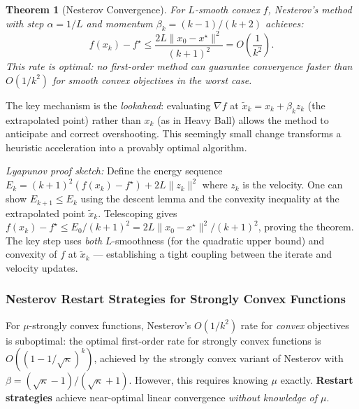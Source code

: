 \documentclass[11pt,a4paper]{article}
\newtheorem{theorem}{Theorem}[section]
\theoremstyle{definition}
\begin{document}
\begin{theorem}[Nesterov Convergence]
For $L$-smooth convex $f$, Nesterov's method with step $\alpha = 1/L$ and momentum $\beta_k = (k-1)/(k+2)$ achieves:
\begin{equation}
f(x_k) - f^{\star} \leq \frac{2L\|x_0 - x^{\star}\|^2}{(k+1)^2} = O\!\left(\frac{1}{k^2}\right).
\end{equation}
This rate is optimal: no first-order method can guarantee convergence faster than $O(1/k^2)$ for smooth convex objectives in the worst case.
\end{theorem}

The key mechanism is the \emph{lookahead}: evaluating $\nabla f$ at $\tilde{x}_k = x_k + \beta_k z_k$ (the extrapolated point) rather than $x_k$ (as in Heavy Ball) allows the method to anticipate and correct overshooting. This seemingly small change transforms a heuristic acceleration into a provably optimal algorithm.

\noindent\textit{Lyapunov proof sketch:} Define the energy sequence $E_k = (k+1)^2(f(x_k) - f^{\star}) + 2L\|z_k\|^2$ where $z_k$ is the velocity. One can show $E_{k+1} \leq E_k$ using the descent lemma and the convexity inequality at the extrapolated point $\tilde{x}_k$. Telescoping gives $f(x_k) - f^{\star} \leq E_0 / (k+1)^2 = 2L\|x_0 - x^{\star}\|^2 / (k+1)^2$, proving the theorem. The key step uses \emph{both} $L$-smoothness (for the quadratic upper bound) and convexity of $f$ at $\tilde{x}_k$ --- establishing a tight coupling between the iterate and velocity updates.

\subsubsection{Nesterov Restart Strategies for Strongly Convex Functions}

For $\mu$-strongly convex functions, Nesterov's $O(1/k^2)$ rate for \emph{convex} objectives is suboptimal: the optimal first-order rate for strongly convex functions is $O((1 - 1/\sqrt{\kappa})^k)$, achieved by the strongly convex variant of Nesterov with $\beta = (\sqrt{\kappa}-1)/(\sqrt{\kappa}+1)$. However, this requires knowing $\mu$ exactly. \textbf{Restart strategies} achieve near-optimal linear convergence \emph{without knowledge of $\mu$}.
\end{document}
